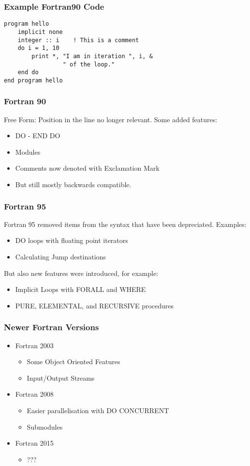 \begin{frame}[fragile]
  \frametitle{Example Fortran90 Code}
  \begin{lstlisting}
program hello
    implicit none
    integer :: i    ! This is a comment
    do i = 1, 10
        print *, "I am in iteration ", i, & 
                 " of the loop."
    end do
end program hello
  \end{lstlisting}
\end{frame}

\begin{frame}
  \frametitle{Fortran 90}
  Free Form: Position in the line no longer relevant.
  Some added features:
  \begin{itemize}
    \item DO - END DO
    \item Modules
    \item Comments now denoted with Exclamation Mark
    \item But still mostly backwards compatible.
  \end{itemize}
\end{frame}

\begin{frame}
  \frametitle{Fortran 95}
  Fortran 95 removed items from the syntax that have been depreciated.
  Examples:
  \begin{itemize}
    \item DO loops with floating point iterators
    \item Calculating Jump destinations
  \end{itemize}
  But also new features were introduced, for example:
  \begin{itemize}
    \item Implicit Loops with FORALL and WHERE
    \item PURE, ELEMENTAL, and RECURSIVE procedures
  \end{itemize}
\end{frame}

\begin{frame}
  \frametitle{Newer Fortran Versions}
  \begin{itemize}
    \item Fortran 2003
    \begin{itemize}
      \item Some Object Oriented Features
      \item Input/Output Streams
    \end{itemize}
    \item Fortran 2008
    \begin{itemize}
      \item Easier parallelisation with DO CONCURRENT
      \item Submodules
    \end{itemize}
    \item Fortran 2015
    \begin{itemize}
      \item ???
    \end{itemize}
  \end{itemize}
\end{frame}

